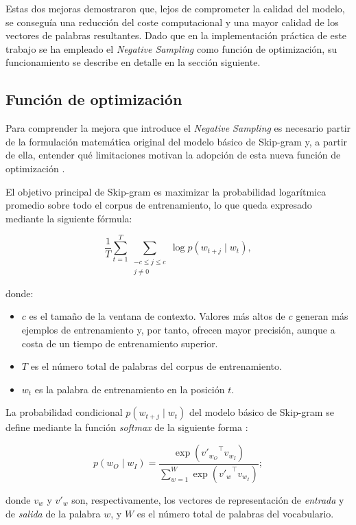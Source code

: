 Estas dos mejoras demostraron que, lejos de comprometer la calidad del modelo, se conseguía una reducción del coste computacional y una mayor calidad de los vectores de palabras resultantes. Dado que en la implementación práctica de este trabajo se ha empleado el \textit{Negative Sampling} como función de optimización, su funcionamiento se describe en detalle en la sección siguiente.

\subsection{Función de optimización}

Para comprender la mejora que introduce el \textit{Negative Sampling} es necesario partir de la formulación matemática original del modelo básico de Skip-gram y, a partir de ella, entender qué limitaciones motivan la adopción de esta nueva función de optimización \cite{tsang_skipgram_review_medium}.

El objetivo principal de Skip-gram es maximizar la probabilidad logarítmica promedio sobre todo el corpus de entrenamiento, lo que queda expresado mediante la siguiente fórmula:

\[
  \frac{1}{T} \sum_{t=1}^{T} \sum_{\substack{-c \leq j \leq c \\ j \neq 0}} \log p(w_{t+j} \mid w_t),
\]

donde:

\begin{itemize}
  \item $c$ es el tamaño de la ventana de contexto. Valores más altos de $c$ generan más ejemplos de entrenamiento y, por tanto, ofrecen mayor precisión, aunque a costa de un tiempo de entrenamiento superior.
  \item $T$ es el número total de palabras del corpus de entrenamiento.
  \item $w_t$ es la palabra de entrenamiento en la posición $t$.
\end{itemize}

La probabilidad condicional $p(w_{t+j} \mid w_t)$ del modelo básico de Skip-gram se define mediante la función \textit{softmax} de la siguiente forma \cite{tsang_skipgram_review_medium}:

\[
  p(w_O \mid w_I) = \frac{\exp\!\left({v'_{w_O}}^{\top} v_{w_I}\right)}{\displaystyle\sum_{w=1}^{W} \exp\!\left({v'_{w}}^{\top} v_{w_I}\right)};
\]

donde $v_w$ y $v'_w$ son, respectivamente, los vectores de representación de \textit{entrada} y de \textit{salida} de la palabra $w$, y $W$ es el número total de palabras del vocabulario.

